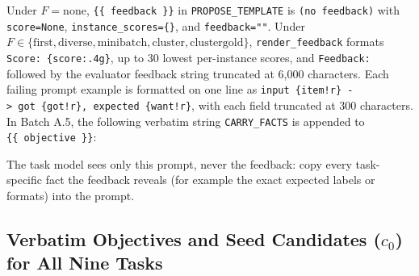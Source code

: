 \documentclass[10pt]{article}
\newenvironment{Shaded}{}{}
\newcommand{\NormalTok}[1]{#1}
\begin{document}
Under \(F = \text{none}\), \texttt{\{\{\ feedback\ \}\}} in
\texttt{PROPOSE\_TEMPLATE} is \texttt{(no\ feedback)} with
\texttt{score=None}, \texttt{instance\_scores=\{\}}, and
\texttt{feedback=""}. Under
\(F \in \{\text{first}, \text{diverse}, \text{minibatch}, \text{cluster}, \text{clustergold}\}\),
\texttt{render\_feedback} formats \texttt{Score:\ \{score:.4g\}}, up to
30 lowest per-instance scores, and \texttt{Feedback:} followed by the
evaluator feedback string truncated at 6,000 characters. Each failing
prompt example is formatted on one line as
\texttt{input\ \{item!r\}\ -\textgreater{}\ got\ \{got!r\},\ expected\ \{want!r\}},
with each field truncated at 300 characters. In Batch A.5, the following
verbatim string \texttt{CARRY\_FACTS} is appended to
\texttt{\{\{\ objective\ \}\}}:

\begin{Shaded}
\begin{Highlighting}[]
\NormalTok{The task model sees only this prompt, never the feedback: copy every task{-}specific}
\NormalTok{fact the feedback reveals (for example the exact expected labels or formats) into}
\NormalTok{the prompt.}
\end{Highlighting}
\end{Shaded}

\hypertarget{verbatim-objectives-and-seed-candidates-c_0-for-all-nine-tasks}{%
\subsection{\texorpdfstring{Verbatim Objectives and Seed Candidates
(\(c_0\)) for All Nine
Tasks}{Verbatim Objectives and Seed Candidates (c\_0) for All Nine Tasks}}\label{verbatim-objectives-and-seed-candidates-c_0-for-all-nine-tasks}}
\end{document}
